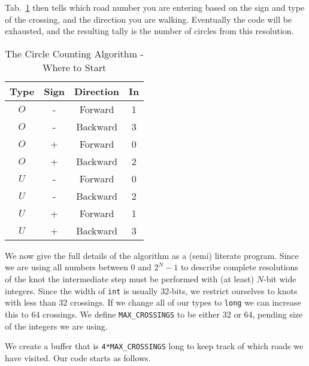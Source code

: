         Tab.~\ref{tab:circle_counting_algorithm_where_start}
        then tells which road number you are entering based on the sign and type
        of the crossing, and the direction you are walking. Eventually the code
        will be exhausted, and the resulting tally is the number of
        circles from this resolution.
        \par\hfill\par
        \begin{table}
            \centering
            \begin{tabular}{c c c c}
                Type&Sign&Direction&In\\
                \hline
                $O$&-&Forward&1\\
                $O$&-&Backward&3\\
                $O$&+&Forward&0\\
                $O$&+&Backward&2\\
                \hline
                $U$&-&Forward&0\\
                $U$&-&Backward&2\\
                $U$&+&Forward&1\\
                $U$&+&Backward&3
            \end{tabular}
            \caption{The Circle Counting Algorithm - Where to Start}
            \label{tab:circle_counting_algorithm_where_start}
        \end{table}
        We now give the full details of the algorithm as a
        (semi) literate program. Since we are using all
        numbers between 0 and $2^{N}-1$ to describe complete resolutions of the
        knot the intermediate step must be performed with (at least) $N$-bit
        wide integers. Since the width of \texttt{int} is usually 32-bits, we
        restrict ourselves to knots with less than 32 crossings. If we change
        all of our types to \texttt{long} we can increase this to 64 crossings.
        We define \texttt{MAX\_CROSSINGS} to be either 32 or 64, pending size
        of the integers we are using.
        \par\hfill\par
        We create a buffer that is \texttt{4*MAX\_CROSSINGS} long to keep track
        of which roads we have visited. Our code starts as follows.
        \newpage
